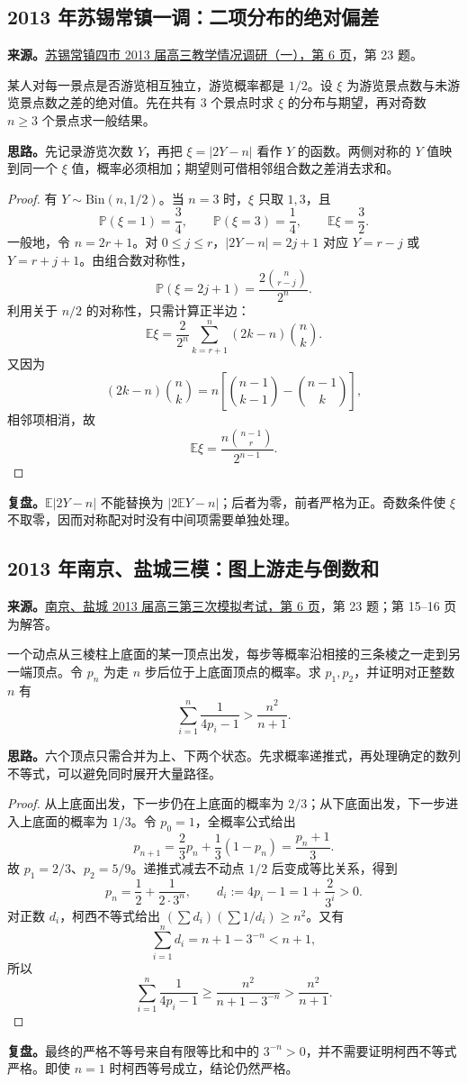 \documentclass[UTF8]{ctexart}
\begin{document}
\subsection{2013 年苏锡常镇一调：二项分布的绝对偏差}\label{sec:c2013sxcz1}
\textbf{来源。}\href{https://doc.xuehai.net/b0d470082d90b0ed78020c4e5-6.html}{苏锡常镇四市 2013 届高三教学情况调研（一），第 6 页}，第 23 题。
\begin{example}[题意]
某人对每一景点是否游览相互独立，游览概率都是 $1/2$。设 $\xi$ 为游览景点数与未游览景点数之差的绝对值。先在共有 $3$ 个景点时求 $\xi$ 的分布与期望，再对奇数 $n\geq3$ 个景点求一般结果。
\end{example}
\textbf{思路。}先记录游览次数 $Y$，再把 $\xi=|2Y-n|$ 看作 $Y$ 的函数。两侧对称的 $Y$ 值映到同一个 $\xi$ 值，概率必须相加；期望则可借相邻组合数之差消去求和。
\begin{proof}
有 $Y\sim\mathrm{Bin}(n,1/2)$。当 $n=3$ 时，$\xi$ 只取 $1,3$，且
\[
\mathbb P(\xi=1)=\frac34,\qquad
\mathbb P(\xi=3)=\frac14,\qquad \mathbb E\xi=\frac32.
\]
一般地，令 $n=2r+1$。对 $0\leq j\leq r$，$|2Y-n|=2j+1$ 对应 $Y=r-j$ 或 $Y=r+j+1$。由组合数对称性，
\[
\mathbb P(\xi=2j+1)=\frac{2\binom n{r-j}}{2^n}.
\]
利用关于 $n/2$ 的对称性，只需计算正半边：
\[
\mathbb E\xi=\frac2{2^n}\sum_{k=r+1}^{n}(2k-n)\binom nk.
\]
又因为
\[
(2k-n)\binom nk
=n\left[\binom{n-1}{k-1}-\binom{n-1}k\right],
\]
相邻项相消，故
\[
\boxed{\mathbb E\xi=\frac{n\binom{n-1}r}{2^{n-1}}.}
\]
\end{proof}
\textbf{复盘。}$\mathbb E|2Y-n|$ 不能替换为 $|2\mathbb EY-n|$；后者为零，前者严格为正。奇数条件使 $\xi$ 不取零，因而对称配对时没有中间项需要单独处理。

\subsection{2013 年南京、盐城三模：图上游走与倒数和}\label{sec:c2013ny3}
\textbf{来源。}\href{https://doc.xuehai.net/b764d9602946662646540b4b9-6.html}{南京、盐城 2013 届高三第三次模拟考试，第 6 页}，第 23 题；第 15--16 页为解答。
\begin{example}[题意]
一个动点从三棱柱上底面的某一顶点出发，每步等概率沿相接的三条棱之一走到另一端顶点。令 $p_n$ 为走 $n$ 步后位于上底面顶点的概率。求 $p_1,p_2$，并证明对正整数 $n$ 有
\[
\sum_{i=1}^{n}\frac1{4p_i-1}>\frac{n^2}{n+1}.
\]
\end{example}
\textbf{思路。}六个顶点只需合并为上、下两个状态。先求概率递推式，再处理确定的数列不等式，可以避免同时展开大量路径。
\begin{proof}
从上底面出发，下一步仍在上底面的概率为 $2/3$；从下底面出发，下一步进入上底面的概率为 $1/3$。令 $p_0=1$，全概率公式给出
\[
p_{n+1}=\frac23p_n+\frac13(1-p_n)=\frac{p_n+1}{3}.
\]
故 $p_1=2/3$、$p_2=5/9$。递推式减去不动点 $1/2$ 后变成等比关系，得到
\[
p_n=\frac12+\frac1{2\cdot3^n},\qquad d_i:=4p_i-1=1+\frac2{3^i}>0.
\]
对正数 $d_i$，柯西不等式给出 $(\sum d_i)(\sum1/d_i)\geq n^2$。又有
\[
\sum_{i=1}^{n}d_i=n+1-3^{-n}<n+1,
\]
所以
\[
\sum_{i=1}^{n}\frac1{4p_i-1}
\geq\frac{n^2}{n+1-3^{-n}}>\frac{n^2}{n+1}.
\]
\end{proof}
\textbf{复盘。}最终的严格不等号来自有限等比和中的 $3^{-n}>0$，并不需要证明柯西不等式严格。即使 $n=1$ 时柯西等号成立，结论仍然严格。
\end{document}
